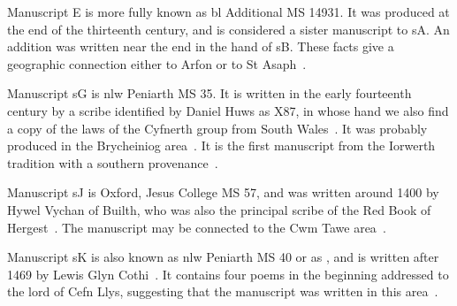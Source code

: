 Manuscript E is more fully known as \gls{bl} Additional MS 14931. It was produced at the end of the thirteenth century, and is considered a sister manuscript to \gls{sA}. An addition was written near the end in the hand of \gls{sB}. These facts give a geographic connection either to Arfon or to St Asaph~\autocite[100]{charles-edwards_welsh_1989}.

Manuscript \gls{sG} is \gls{nlw} Peniarth MS 35. It is written in the early fourteenth century by a scribe identified by Daniel Huws as X87, in whose hand we also find a copy of the laws of the Cyfnerth group from South Wales~\autocite{smith_tei_???}. It was probably produced in the Brycheiniog area~\autocite[v]{elias_golygiad_2007}. It is the first manuscript from the Iorwerth tradition with a southern provenance~\autocite{charles-edwards_texts:_1986}.

Manuscript \gls{sJ} is Oxford, Jesus College MS 57, and was written around 1400 by Hywel Vychan of Builth, who was also the principal scribe of the Red Book of Hergest~\autocite[100]{charles-edwards_welsh_1989}. The manuscript may be connected to the Cwm Tawe area~\autocite{james_llwyr_1993}.

Manuscript \gls{sK} is also known as \gls{nlw} Peniarth MS 40 or as , and is written after 1469 by Lewis Glyn Cothi~\autocite{roberts_cyfraith_2011}. It contains four poems in the beginning addressed to the lord of Cefn Llys, suggesting that the manuscript was written in this area~\autocite[374]{evans_report_1899}.

